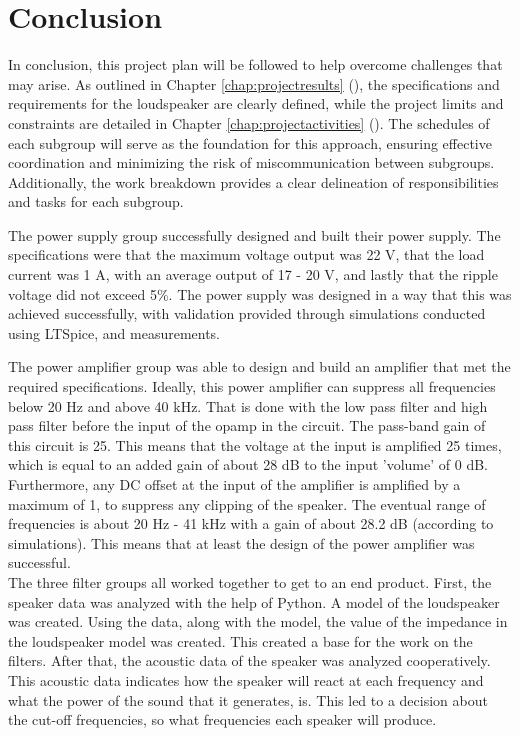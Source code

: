 \chapter{Conclusion} 
\setlength{\parindent}{20pt}
In conclusion, this project plan will be followed to help overcome challenges that may arise. As outlined in Chapter \ref{chap:projectresults} (), the specifications and requirements for the loudspeaker are clearly defined, while the project limits and constraints are detailed in Chapter \ref{chap:projectactivities} (). The schedules of each subgroup will serve as the foundation for this approach, ensuring effective coordination and minimizing the risk of miscommunication between subgroups. Additionally, the work breakdown provides a clear delineation of responsibilities and tasks for each subgroup.  \\



The power supply group successfully designed and built their power supply. The specifications were that the maximum voltage output was 22 V, that the load current was 1 A, with an average output of 17 - 20 V, and lastly that the ripple voltage did not exceed 5\%. The power supply was designed in a way that this was achieved successfully, with validation provided through simulations conducted using LTSpice, and measurements.\\


The power amplifier group was able to design and build an amplifier that met the required specifications. Ideally, this power amplifier can suppress all frequencies below 20 Hz and above 40 kHz. That is done with the low pass filter and high pass filter before the input of the opamp in the circuit. The pass-band gain of this circuit is 25. This means that the voltage at the input is amplified 25 times, which is equal to an added gain of about 28 dB to the input 'volume' of 0 dB. Furthermore, any DC offset at the input of the amplifier is amplified by a maximum of 1, to suppress any clipping of the speaker. The eventual range of frequencies is about 20 Hz - 41 kHz with a gain of about 28.2 dB (according to simulations). This means that at least the design of the power amplifier was successful.\\

The three filter groups all worked together to get to an end product. First, the speaker data was analyzed with the help of Python. A model of the loudspeaker was created. Using the data, along with the model, the value of the impedance in the loudspeaker model was created. This created a base for the work on the filters. After that, the acoustic data of the speaker was analyzed cooperatively. This acoustic data indicates how the speaker will react at each frequency and what the power of the sound that it generates, is. This led to a decision about the cut-off frequencies, so what frequencies each speaker will produce.

